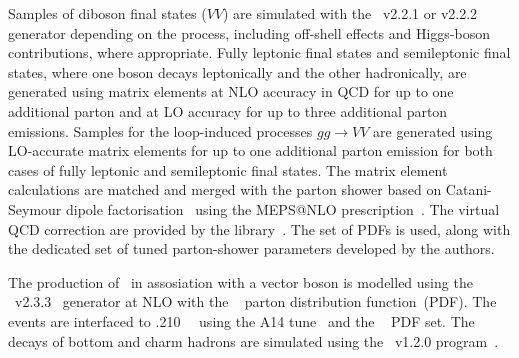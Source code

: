 Samples of diboson final states ($VV$) are simulated with the
\sherpa~v2.2.1 or v2.2.2~\cite{Bothmann:2019yzt} generator depending on the process,
including off-shell effects and Higgs-boson contributions, where appropriate.
Fully leptonic final states and semileptonic final states, where one boson
decays leptonically and the other hadronically, are generated using
matrix elements at NLO accuracy in QCD for up to one additional parton
and at LO accuracy for up to three additional parton
emissions. Samples for the loop-induced processes $gg \to VV$ are
generated using LO-accurate matrix elements for up to one
additional parton emission for both cases of fully leptonic and
semileptonic final states. The matrix element calculations are matched
and merged with the \sherpa parton shower based on Catani-Seymour
dipole factorisation~\cite{Gleisberg:2008fv,Schumann:2007mg} using the MEPS@NLO
prescription~\cite{Hoeche:2011fd,Hoeche:2012yf,Catani:2001cc,Hoeche:2009rj}.
The virtual QCD correction are provided by the
\openloops library~\cite{Buccioni:2019sur,Cascioli:2011va,Denner:2016kdg}. The
\nnpdfnnlo set of PDFs is used, %
along with the dedicated set of tuned parton-shower parameters developed by the
\sherpa authors.

The production of \ttbar\ in assosiation with a vector boson 
is modelled using the
\mgamc~v2.3.3~\cite{Alwall:2014hca} generator at NLO with the
\nnpdfnlo~\cite{Ball:2014uwa} parton distribution function~(PDF).
The events are interfaced to \pythia.210~\cite{Sjostrand:2014zea}~
using the A14 tune~\cite{ATL-PHYS-PUB-2014-021} and the
\nnpdftwo~\cite{Ball:2014uwa} PDF set. The decays of bottom and charm
hadrons are simulated using the \evtgen\ v1.2.0 program~\cite{Lange:2001uf}.



